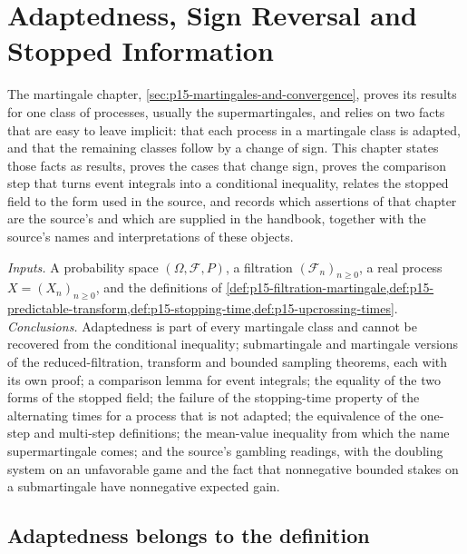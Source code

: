 \chapter{Adaptedness, Sign Reversal and Stopped Information}
\label{sec:p15-w02c-p15-019}

The martingale chapter, \cref{sec:p15-martingales-and-convergence},
proves its results for one class of processes, usually the
supermartingales, and relies on two facts that are easy to leave
implicit: that each process in a martingale class is adapted, and that
the remaining classes follow by a change of sign. This chapter states
those facts as results, proves the cases that change sign, proves the
comparison step that turns event integrals into a conditional
inequality, relates the stopped field to the form used in the source,
and records which assertions of that chapter are the source's and which
are supplied in the handbook, together with the source's names and
interpretations of these objects.

\emph{Inputs.} A probability space \((\Omega,\mathcal F,P)\), a
filtration \((\mathcal F_n)_{n\geq0}\), a real process
\(X=(X_n)_{n\geq0}\), and the definitions of
\cref{def:p15-filtration-martingale,def:p15-predictable-transform,def:p15-stopping-time,def:p15-upcrossing-times}.
\emph{Conclusions.} Adaptedness is part of every martingale class and
cannot be recovered from the conditional inequality; submartingale and
martingale versions of the reduced-filtration, transform and bounded
sampling theorems, each with its own proof; a comparison lemma for
event integrals; the equality of the two forms of the stopped field;
the failure of the stopping-time property of the alternating times
for a process that is not adapted; the equivalence of the one-step and
multi-step definitions; the mean-value inequality from which the name
supermartingale comes; and the source's gambling readings, with the
doubling system on an unfavorable game and the fact that nonnegative
bounded stakes on a submartingale have nonnegative expected gain.

\section{Adaptedness belongs to the definition}
\label{sec:p15-w02c-p15-019-adapted}

